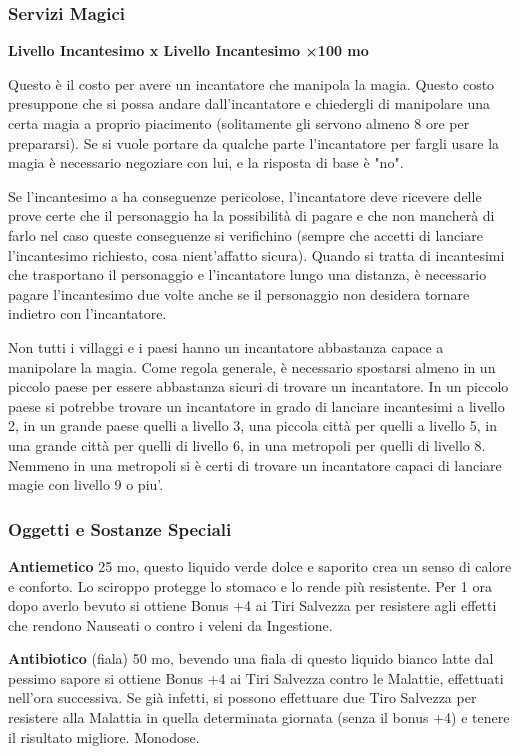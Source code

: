 \documentclass[12pt,a4paper,twoside,openany]{book}
\begin{document}
\begin{multicols}{2}
\subsubsection{Servizi Magici}

\textbf{Livello Incantesimo x Livello Incantesimo ×100 mo}

Questo è il costo per avere un incantatore che manipola la magia. Questo costo presuppone che si possa andare dall’incantatore e chiedergli di manipolare una certa magia a proprio piacimento (solitamente gli servono almeno 8 ore per prepararsi). Se si vuole portare da qualche parte l’incantatore per fargli usare la magia è necessario negoziare con lui, e la risposta di base è "no".

Se l’incantesimo a ha conseguenze pericolose, l’incantatore deve ricevere delle prove certe che il personaggio ha la possibilità di pagare e che non mancherà di farlo nel caso queste conseguenze si verifichino (sempre che accetti di lanciare l’incantesimo richiesto, cosa nient’affatto sicura). Quando si tratta di incantesimi che trasportano il personaggio e l’incantatore lungo una distanza, è necessario pagare l’incantesimo due volte anche se il personaggio non desidera tornare indietro con l’incantatore.

Non tutti i villaggi e i paesi hanno un incantatore abbastanza capace a manipolare la magia. Come regola generale, è necessario spostarsi almeno in un piccolo paese per essere abbastanza sicuri di trovare un incantatore. In un piccolo paese si potrebbe trovare un incantatore in grado di lanciare incantesimi a livello 2, in un grande paese quelli a livello 3, una piccola città per quelli a livello 5, in una grande città per quelli di livello 6, in una metropoli per quelli di livello 8. Nemmeno in una metropoli si è certi di trovare un incantatore capaci di lanciare magie con livello 9 o piu’.


\subsubsection{Oggetti e Sostanze Speciali}

\textbf{Antiemetico} 25 mo,  questo liquido verde dolce e saporito crea un senso di calore e conforto. Lo sciroppo protegge lo stomaco e lo rende più resistente. Per 1 ora dopo averlo bevuto si ottiene Bonus +4 ai Tiri Salvezza per resistere agli effetti che rendono Nauseati o contro i veleni da Ingestione.

\textbf{Antibiotico} (fiala) 50 mo, bevendo una fiala di questo liquido bianco latte dal pessimo sapore si ottiene Bonus +4 ai Tiri Salvezza contro le Malattie, effettuati nell'ora successiva. Se già infetti, si possono effettuare due Tiro Salvezza per resistere alla Malattia in quella determinata giornata (senza il bonus +4) e tenere il risultato migliore. Monodose. 


\end{multicols}
\end{document}

